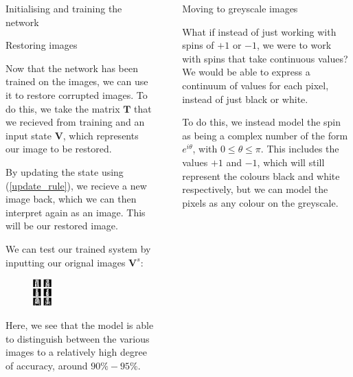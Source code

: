 \documentclass[25pt, a0paper, portrait]{beamer}
\newlength{\sepwidth}
\newlength{\colwidth}
\newcommand{\separatorcolumn}{\begin{column}{\sepwidth}\end{column}}
\begin{document}
\begin{frame}[t]
\begin{columns}[t]
\begin{column}{\colwidth}
\begin{block}{Initialising and training the network}
  \end{block}

  \begin{block}{Restoring images} \small

    Now that the network has been trained on the images, we can use it to restore
    corrupted images. To do this, we take the matrix $\boldsymbol{T}$ that we
    recieved from training and an input state $\boldsymbol{V}$, which represents
    our image to be restored.

    By updating the state using (\ref{update_rule}), we recieve a new image back,
    which we can then interpret again as an image. This will be our restored image.

    We can test our trained system by inputting our orignal images $\boldsymbol{V}^s$:
    
    \begin{figure}
      \centering
      \includegraphics[width=0.2\textwidth]{bwoutput}
    \end{figure}

    Here, we see that the model is able to distinguish between the various images to
    a relatively high degree of accuracy, around $90\% - 95\%$.

  \end{block}

\end{column}

\separatorcolumn

\begin{column}{\colwidth}

  \begin{block}{Moving to greyscale images} \small

    What if instead of just working with spins of $+1$ or $-1$, we were to work
    with spins that take continuous values? We would be able to express a continuum
    of values for each pixel, instead of just black or white.

    To do this, we instead model the spin as being a complex number of the form $e^{i\theta}$,
    with $0 \le \theta \le \pi$. This includes the values $+1$ and $-1$, which will still
    represent the colours black and white respectively, but we can model the pixels
    as any colour on the greyscale.


\end{block}
\end{column}
\end{columns}
\end{frame}
\end{document}
